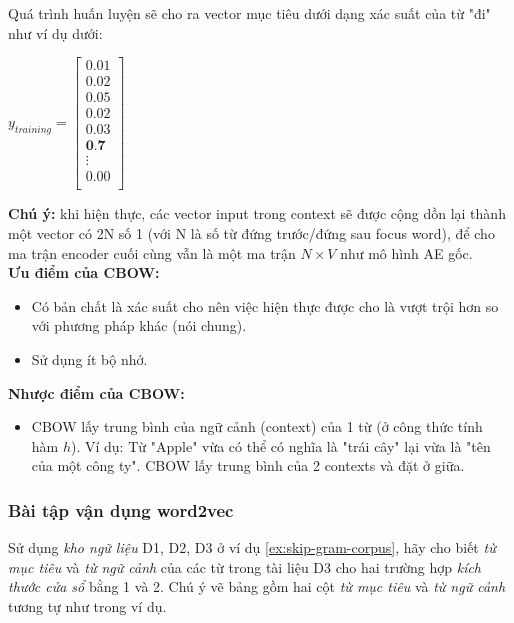 Quá trình huấn luyện sẽ cho ra vector mục tiêu dưới dạng xác suất của từ "đi" như ví dụ dưới:
\begin{center}
    $y_{training} = 
    \begin{bmatrix}
        0.01 \\
        0.02 \\
        0.05 \\
        0.02 \\
        0.03 \\
        \textbf{0.7} \\
        \vdots \\
        0.00 \\
    \end{bmatrix}
    $
\end{center}

\textbf{Chú ý: } khi hiện thực, các vector input trong context sẽ được cộng dồn lại thành một vector có 2N số 1 (với N là số từ đứng trước/đứng sau focus word), để cho ma trận encoder cuối cùng vẫn là một ma trận $N\times V$ như mô hình AE gốc.\\

\textbf{Ưu điểm của CBOW:}
\begin{itemize}
  \item Có bản chất là xác suất cho nên việc hiện thực được cho là vượt trội hơn so với phương pháp khác (nói chung).
  \item Sử dụng ít bộ nhớ.
\end{itemize}

\textbf{Nhược điểm của CBOW:}
\begin{itemize}
  \item CBOW lấy trung bình của ngữ cảnh (context) của 1 từ (ở công thức tính hàm $h$). Ví dụ: Từ "Apple" vừa có thể có nghĩa là "trái cây" lại vừa là "tên của một công ty". CBOW lấy trung bình của 2 contexts và đặt ở giữa.
\end{itemize}

\subsubsection{Bài tập vận dụng word2vec}
\begin{exer}
Sử dụng \textit{kho ngữ liệu} D1, D2, D3 ở ví dụ \ref{ex:skip-gram-corpus}, hãy cho biết \textit{từ mục tiêu} và \textit{từ ngữ cảnh} của các từ trong tài liệu D3 cho hai trường hợp \textit{kích thước cửa sổ} bằng 1 và 2. Chú ý vẽ bảng gồm hai cột \textit{từ mục tiêu} và \textit{từ ngữ cảnh} tương tự như trong ví dụ.
\end{exer}

